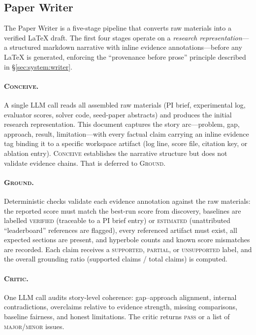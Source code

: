 \subsection{Paper Writer}
\label{app:paper_writer_pipeline}

The Paper Writer is a five-stage pipeline that converts raw materials into a verified \LaTeX{} draft. The first four stages operate on a \emph{research representation}---a structured markdown narrative with inline evidence annotations---before any \LaTeX{} is generated, enforcing the ``provenance before prose'' principle described in \S\ref{sec:system:writer}.

\paragraph{\textsc{Conceive}.}
A single LLM call reads all assembled raw materials (PI brief, experimental log, evaluator scores, solver code, seed-paper abstracts) and produces the initial research representation. This document captures the story arc---problem, gap, approach, result, limitation---with every factual claim carrying an inline evidence tag binding it to a specific workspace artifact (log line, score file, citation key, or ablation entry). \textsc{Conceive} establishes the narrative structure but does not validate evidence chains. That is deferred to \textsc{Ground}.

\paragraph{\textsc{Ground}.}
Deterministic checks validate each evidence annotation against the raw materials: the reported score must match the best-run score from discovery, baselines are labelled \textsc{verified} (traceable to a PI brief entry) or \textsc{estimated} (unattributed ``leaderboard'' references are flagged), every referenced artifact must exist, all expected sections are present, and hyperbole counts and known score mismatches are recorded. Each claim receives a \textsc{supported}, \textsc{partial}, or \textsc{unsupported} label, and the overall grounding ratio (supported claims / total claims) is computed.

\paragraph{\textsc{Critic}.}
One LLM call audits story-level coherence: gap--approach alignment, internal contradictions, overclaims relative to evidence strength, missing comparisons, baseline fairness, and honest limitations. The critic returns \textsc{pass} or a list of \textsc{major}/\textsc{minor} issues.

